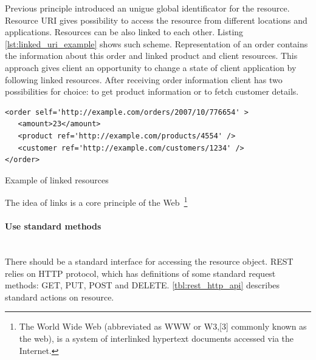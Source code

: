 Previous principle introduced an unigue global identificator for the resource.
Resource URI gives possibility to access the resource from different locations
and applications. Resources can be also linked to each other.
Listing \ref{lst:linked_uri_example} shows such scheme. Representation of an
order contains the information about this order and linked product and client resources.
This approach gives client an opportunity to change a state of client application by following linked
resources. After receiving order information client has two possibilities for
choice: to get product information or to fetch customer details. 

\begin{listing}[H]
\begin{verbatim}
<order self='http://example.com/orders/2007/10/776654' > 
   <amount>23</amount> 
   <product ref='http://example.com/products/4554' /> 
   <customer ref='http://example.com/customers/1234' /> 
</order> 
\end{verbatim}
\caption{Example of linked resources~\cite{rest_brief_intro}}
\label{lst:linked_uri_example}
\end{listing}
 
The idea of links is a core principle of the Web~\footnote{The World Wide Web
(abbreviated as WWW or W3,[3] commonly known as the web), is a system of
interlinked hypertext documents accessed via the Internet.\cite{wikipedia:WWW}}

\paragraph{Use standard methods} ~\\

There should be a standard interface for accessing the resource object.
REST relies on HTTP protocol, which has definitions of some standard request
methods:
GET, PUT, POST and DELETE.
\autoref{tbl:rest_http_api} describes standard actions on resource.

